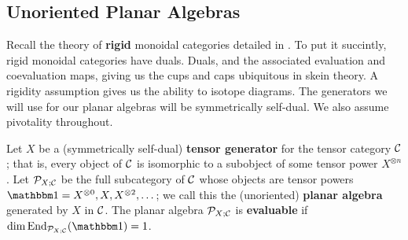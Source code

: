 \subsection{Unoriented Planar Algebras}
Recall the theory of {\bf rigid} monoidal categories detailed in \cite{KW}. 
To put it succintly, rigid monoidal categories have duals. 
Duals, and the associated evaluation and coevaluation maps, 
giving us the cups and caps ubiquitous in skein theory. 
A rigidity assumption gives us the ability to isotope diagrams. 
The generators we will use for our planar algebras will be symmetrically self-dual.
We also assume pivotality throughout.

Let $X$ be a (symmetrically self-dual) {\bf tensor generator} for the tensor category $\mathcal{C}$; 
that is, every object of $\mathcal{C}$ is isomorphic to a subobject of some tensor power $X^{\otimes n}$. 
Let $\mathcal{P}_{X;\mathcal{C}}$ be the full subcategory of $\mathcal{C}$ whose objects are tensor powers $\unit=X^{\otimes0},X,X^{\otimes2},\dots$; 
we call this the (unoriented) {\bf planar algebra} generated by $X$ in $\mathcal{C}$. 
The planar algebra $\mathcal{P}_{X;\mathcal{C}}$ is {\bf evaluable} if $\dim\End_{\PP_{X;\CC}}(\unit)=1$. 

